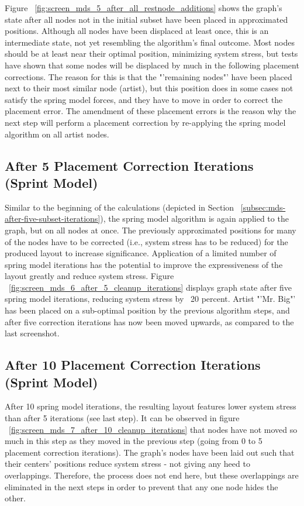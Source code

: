 Figure ~\ref{fig:screen_mds_5_after_all_restnode_additions} shows the graph's state after all nodes not in the initial subset have been placed in approximated positions. Although all nodes have been displaced at least once, this is an intermediate state, not yet resembling the algorithm's final outcome. Most nodes should be at least near their optimal position, minimizing system stress, but tests have shown that some nodes will be displaced by much in the following placement corrections. The reason for this is that the "'remaining nodes"' have been placed next to their most similar node (artist), but this position does in some cases not satisfy the spring model forces, and they have to move in order to correct the placement error. The amendment of these placement errors is the reason why the next step will perform a placement correction by re-applying the spring model algorithm on all artist nodes.

\subsection{After 5 Placement Correction Iterations (Sprint Model)}

Similar to the beginning of the calculations (depicted in Section ~\ref{subsec:mds-after-five-subset-iterations}), the spring model algorithm is again applied to the graph, but on all nodes at once. The previously approximated positions for many of the nodes have to be corrected (i.e., system stress has to be reduced) for the produced layout to increase significance. Application of a limited number of spring model iterations has the potential to improve the expressiveness of the layout greatly and reduce system stress. Figure ~\ref{fig:screen_mds_6_after_5_cleanup_iterations} displays graph state after five spring model iterations, reducing system stress by ~20 percent. Artist "'Mr. Big"' has been placed on a sub-optimal position by the previous algorithm steps, and after five correction iterations has now been moved upwards, as compared to the last screenshot.

\subsection{After 10 Placement Correction Iterations (Sprint Model)}
\label{subsec:mds-after-ten-placement-iterations}

After 10 spring model iterations, the resulting layout features lower system stress than after 5 iterations (see last step). It can be observed in figure ~\ref{fig:screen_mds_7_after_10_cleanup_iterations} that nodes have not moved so much in this step as they moved in the previous step (going from 0 to 5 placement correction iterations).
The graph's nodes have been laid out such that their centers' positions reduce system stress - not giving any heed to overlappings. Therefore, the process does not end here, but these overlappings are eliminated in the next steps in order to prevent that any one node hides the other.

